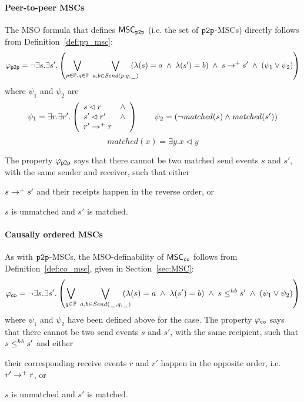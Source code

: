 \paragraph{\bf Peer-to-peer MSCs}
The MSO formula that defines $\mathsf{MSC}_{\mathtt{p2p}}$ (i.e. the set of $\mathtt{p2p}$-MSCs) directly follows from Definition~\ref{def:pp_msc}:
\[
	\varphi_{\mathsf{p2p}} = \neg \exists s.\exists s'. \left(
	\bigvee_{\substack{p \in \mathbb{P}, q \in \mathbb{P}}}\;
	\bigvee_{\substack{a,b \in {\mathit{Send}(p,q,\hspace{0.1em}\underline{\hspace{0.5em}}\hspace{0.1em})}}}\hspace{-1em}
	(\lambda(s) = a \;\wedge\; \lambda(s') = b) \;\wedge\; s \to^+ s' \;\wedge\;
	(\psi_1 \vee \psi_2 )
	\right)
\]
where $\psi_1$ and $\psi_2$ are
\[
	\psi_1 = \exists r.\exists r'.\left(
	\begin{array}{ll}
		s \lhd r & \wedge\\
		s' \lhd r' & \wedge\\
		r' \to^+ r &
	\end{array}
	\right) \quad \quad
	\psi_2 = (\neg \mathit{matched}(s) \wedge \mathit{matched}(s'))
	\]
	\[
	matched(x) = \exists y. x \lhd y
\]

The property $\varphi_{\mathsf{p2p}}$ says that there cannot be two matched send events $s$ and $s'$, with the same sender and receiver, such that either
\begin{enumerate*}[label={(\roman*)}]
	\item $s \to^+ s'$ and their receipts happen in the reverse order, or
	\item $s$ is unmatched and $s'$ is matched.
\end{enumerate*}


\paragraph{\bf Causally ordered MSCs}
As with $\mathtt{p2p}$-MSCs, the MSO-definability of $\mathsf{MSC}_{\mathtt{co}}$ follows from Definition~\ref{def:co_msc}, given in Section~\ref{sec:MSC}:
\[
	\varphi_{\mathsf{co}} = \neg \exists s.\exists s'. \left(
	\bigvee_{\substack{q \in \mathbb{P}}}\;
	\bigvee_{\substack{a,b \in {\mathit{Send}(\hspace{0.1em}\underline{\hspace{0.5em}}\hspace{0.1em},q,\hspace{0.1em}\underline{\hspace{0.5em}}\hspace{0.1em})}}}\hspace{-1em}
	(\lambda(s) = a \;\wedge\; \lambda(s') = b) \;\wedge\; s \leq^{hb} s' \;\wedge\;
	(\psi_1 \vee \psi_2 )
	\right)
\]
where $\psi_1$ and $\psi_2$ have been defined above for the \pp case. The property $\varphi_{\mathsf{co}}$ says that there cannot be two send events $s$ and $s'$, with the same recipient, such that $s \leq^{hb} s'$ and either
\begin{enumerate*}[label={(\roman*)}]
	\item their corresponding receive events $r$ and $r'$ happen in the opposite order, i.e. $r' \to^+ r$, or
	\item $s$ is unmatched and $s'$ is matched.
\end{enumerate*}


